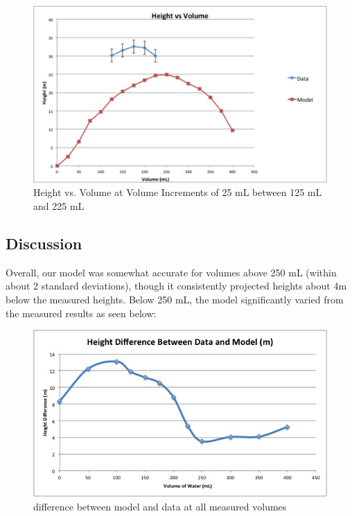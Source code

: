 \documentclass[12pt]{article}
\begin{document}
\begin{figure}[H]
\includegraphics[scale=.5]{newdata.png}
\centering
\caption{Height vs. Volume at Volume Increments of 25 mL between 125 mL and 225 mL}
\end{figure}
  
  \subsection{Discussion}
  Overall, our model was somewhat accurate for volumes above 250 mL (within about 2 standard deviations), though it consistently projected heights about 4m below the measured heights. Below 250 mL, the model significantly varied from the measured results as seen below:
  
  \begin{figure}[H]
    \includegraphics[scale=.5]{Difference.jpg}
    \centering
    \caption{difference between model and data at all measured volumes}
    \end{figure}
    
\end{document}
